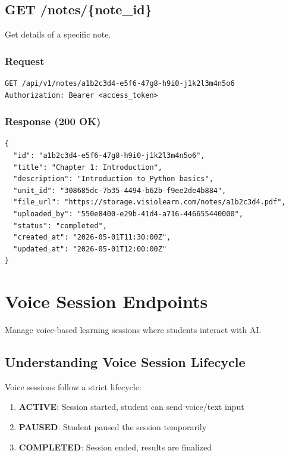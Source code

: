 \documentclass[12pt,a4paper,oneside]{article}
\begin{document}
\subsection{GET /notes/\{note\_id\}}

Get details of a specific note.

\subsubsection{Request}

\begin{lstlisting}
GET /api/v1/notes/a1b2c3d4-e5f6-47g8-h9i0-j1k2l3m4n5o6
Authorization: Bearer <access_token>
\end{lstlisting}

\subsubsection{Response (200 OK)}

\begin{lstlisting}
{
  "id": "a1b2c3d4-e5f6-47g8-h9i0-j1k2l3m4n5o6",
  "title": "Chapter 1: Introduction",
  "description": "Introduction to Python basics",
  "unit_id": "308685dc-7b35-4494-b62b-f9ee2de4b884",
  "file_url": "https://storage.visiolearn.com/notes/a1b2c3d4.pdf",
  "uploaded_by": "550e8400-e29b-41d4-a716-446655440000",
  "status": "completed",
  "created_at": "2026-05-01T11:30:00Z",
  "updated_at": "2026-05-01T12:00:00Z"
}
\end{lstlisting}

\newpage

\section{Voice Session Endpoints}

Manage voice-based learning sessions where students interact with AI.

\subsection{Understanding Voice Session Lifecycle}

Voice sessions follow a strict lifecycle:

\begin{enumerate}
    \item \textbf{ACTIVE}: Session started, student can send voice/text input
    \item \textbf{PAUSED}: Student paused the session temporarily
    \item \textbf{COMPLETED}: Session ended, results are finalized
\end{enumerate}
\end{document}
